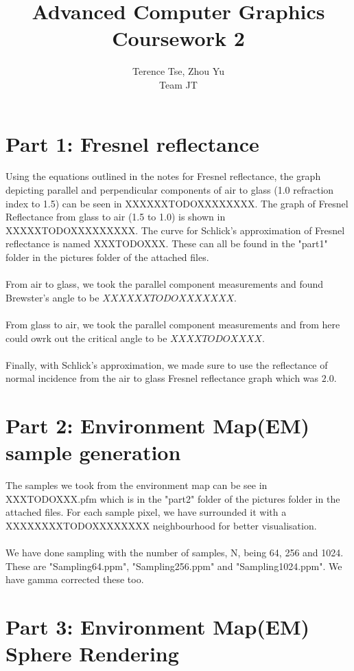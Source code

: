 \documentclass{article}
\begin{document}
\title{Advanced Computer Graphics\\ Coursework 2}
\author{Terence Tse, Zhou Yu \\ Team JT}
\maketitle
\newpage

\section{Part 1: Fresnel reflectance}
Using the equations outlined in the notes for Fresnel reflectance,
the graph depicting parallel and perpendicular components of air to glass
(1.0 refraction index to 1.5) can be seen in XXXXXXTODOXXXXXXXX. The
graph of Fresnel Reflectance from glass to air (1.5 to 1.0) is shown in 
XXXXXTODOXXXXXXXXX. The curve for Schlick's approximation of Fresnel
reflectance is named XXXTODOXXX. These can all be found in the "part1" folder
in the pictures folder of the attached files.\\
\\
From air to glass, we took the parallel component measurements and found
Brewster's angle to be $XXXXXXTODOXXXXXXX$.\\
\\
From glass to air, we took the parallel component measurements and from here
could owrk out the critical angle to be $XXXXTODOXXXX$.\\
\\
Finally, with Schlick's approximation, we made sure to use the reflectance
of normal incidence from the air to glass Fresnel reflectance graph which 
was $2.0$.

\section{Part 2: Environment Map(EM) sample generation}
The samples we took from the environment map can be see in XXXTODOXXX.pfm which
is in the "part2" folder of the pictures folder in the attached files. For 
each sample pixel, we have surrounded it with a XXXXXXXXTODOXXXXXXXX 
neighbourhood for better visualisation.\\
\\
We have done sampling with the number of samples, N, being 64, 256 and 1024.
These are "Sampling64.ppm", "Sampling256.ppm" and "Sampling1024.ppm". We have
gamma corrected these too.

\section{Part 3: Environment Map(EM) Sphere Rendering}
\end{document}

